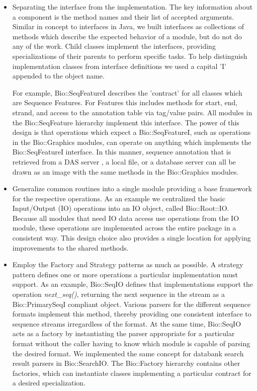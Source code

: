 \documentclass[12pt]{article}
\begin{document}
\begin{itemize}

\item Separating the interface from the implementation.  The key
information about a component is the method names and their list
of accepted arguments.  Similar in concept to interfaces in Java, we
built interfaces as collections of methods which describe the expected
behavior of a module, but do not do any of the work.  Child classes
implement the interfaces, providing specializations of their parents
to perform specific tasks.  To help distinguish implementation classes from
interface definitions we used a capital 'I' appended to the object
name.

For example, Bio::SeqFeatureI describes the 'contract' for all classes
which are Sequence Features.  For Features this includes methods for
start, end, strand, and access to the annotation table via tag/value
pairs.  All modules in the Bio::SeqFeature hierarchy implement this
interface.  The power of this design is that operations which expect a
Bio::SeqFeatureI, such as operations in the Bio::Graphics modules, can
operate on anything which implements the Bio::SeqFeatureI interface.
In this manner, sequence annotation that is retrieved from a DAS
server \cite{das}, a local file, or a database server can all be drawn
as an image with the same methods in the Bio::Graphics modules.

\item Generalize common routines into a single module providing a base
framework for the respective operations.  As an example we centralized
the basic Input/Output (IO) operations into an IO object, called
Bio::Root::IO.  Because all modules that need IO data access use
operations from the IO module, these operations are implemented across
the entire package in a consistent way.  This design choice also
provides a single location for applying improvements to the shared
methods.

\item Employ the Factory and Strategy patterns \cite{gangoffour} as
much as possible. A strategy pattern defines one or more operations a
particular implementation must support. As an example, Bio::SeqIO
defines that implementations support the operation
\textit{next\_seq()}, returning the next sequence in the stream as a
Bio::PrimarySeqI compliant object. Various parsers for the different
sequence formats implement this method, thereby providing one
consistent interface to sequence streams irregardless of the
format. At the same time, Bio::SeqIO acts as a factory by
instantiating the parser appropriate for a particular format without
the caller having to know which module is capable of parsing the
desired format. We implemented the same concept for databank search
result parsers in Bio::SearchIO. The Bio::Factory hierarchy contains
other factories, which can instantiate classes implementing a
particular contract for a desired specialization.

\end{itemize}
\end{document}
